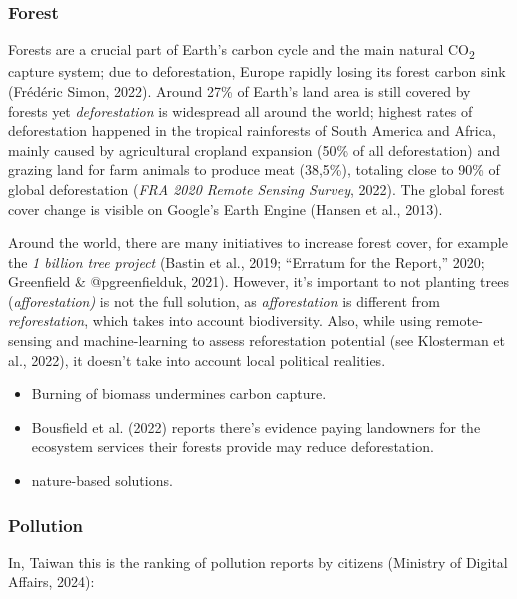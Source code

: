 \documentclass[
  letterpaper,
  DIV=11,
  numbers=noendperiod]{scrartcl}
\providecommand{\tightlist}{%
  \setlength{\itemsep}{0pt}\setlength{\parskip}{0pt}}\usepackage{longtable,booktabs,array}
\begin{document}
\subsubsection{Forest}\label{forest}

Forests are a crucial part of Earth's carbon cycle and the main natural
CO\textsubscript{2} capture system; due to deforestation, Europe rapidly
losing its forest carbon sink (Frédéric Simon, 2022). Around 27\% of
Earth's land area is still covered by forests yet \emph{deforestation}
is widespread all around the world; highest rates of deforestation
happened in the tropical rainforests of South America and Africa, mainly
caused by agricultural cropland expansion (50\% of all deforestation)
and grazing land for farm animals to produce meat (38,5\%), totaling
close to 90\% of global deforestation (\emph{{FRA} 2020 {Remote Sensing
Survey}}, 2022). The global forest cover change is visible on Google's
Earth Engine (Hansen et al., 2013).

Around the world, there are many initiatives to increase forest cover,
for example the \emph{1 billion tree project} (Bastin et al., 2019;
{``Erratum for the {Report},''} 2020; Greenfield \& @pgreenfielduk,
2021). However, it's important to not planting trees
(\emph{afforestation)} is not the full solution, as \emph{afforestation}
is different from \emph{reforestation}, which takes into account
biodiversity. Also, while using remote-sensing and machine-learning to
assess reforestation potential (see Klosterman et al., 2022), it doesn't
take into account local political realities.

\begin{itemize}
\tightlist
\item
  Burning of biomass undermines carbon capture.
\item
  Bousfield et al. (2022) reports there's evidence paying landowners for
  the ecosystem services their forests provide may reduce deforestation.
\item
  nature-based solutions.
\end{itemize}

\subsubsection{Pollution}\label{pollution}

In, Taiwan this is the ranking of pollution reports by citizens
(Ministry of Digital Affairs, 2024):
\end{document}
